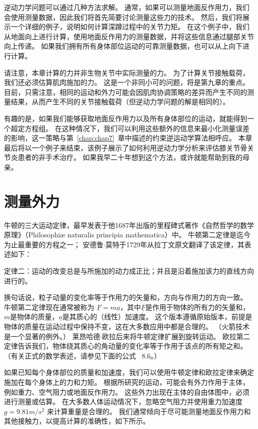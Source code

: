 逆动力学问题可以通过几种方法求解。
通常，如果可以测量地面反作用力，我们会使用测量数据，因此我们将首先简要讨论测量这些力的技术。
然后，我们将展示一个详细的例子，说明如何计算深蹲过程中的关节力矩。
在这个例子中，我们从地面向上进行计算，使用地面反作用力的测量数据，并将这些信息通过腿部关节向上传递。
如果我们拥有所有身体部位运动的可靠测量数据，也可以从上向下进行计算。


请注意，本章计算的力并非生物关节中实际测量的力。
为了计算关节接触载荷，我们还必须估算肌肉施加的力。
这是一个非同小可的问题，将是第九章的重点。
目前，只需注意，相同的运动和外力可能会因肌肉协调策略的差异而产生不同的测量结果，从而产生不同的关节接触载荷（但逆动力学问题的解是相同的）。


有趣的是，如果我们能够获取地面反作用力以及所有身体部位的运动，就能得到一个超定方程组。
在这种情况下，我们可以利用这些额外的信息来最小化测量误差的影响，这一策略与第~\ref{chap:chap7}~章中描述的约束逆运动学算法相呼应。
本章最后将以一个例子来结束，该例子展示了如何利用逆动力学分析来评估膝关节骨关节炎患者的非手术治疗。
如果我早二十年想到这个方法，或许就能帮助到我的母亲。



\section{测量外力}

牛顿的三大运动定律，最早发表于他1687年出版的里程碑式著作《自然哲学的数学原理》（Philosophiæ naturalis principia mathematica）中。
牛顿第二定律是迄今为止最重要的方程之一；
安德鲁$\cdot$莫特于1729年从拉丁文原文翻译了该定律，其表述如下：


定律二：运动的改变总是与所施加的动力成正比；并且是沿着施加该力的直线方向进行的。


换句话说，粒子动量的变化率等于作用力的矢量和，方向与作用力的方向一致。
牛顿第二定律现在通常被称为 $\underline{F} = m \underline{a}$，其中$\underline{F}$是作用于物体的所有力的矢量和，$m$是物体的质量，$\underline{a}$是其质心的（线性）加速度。
这个版本遵循原始版本，前提是物体的质量在运动过程中保持不变，这在大多数应用中都是合理的。
（火箭技术是一个显著的例外。）
莱昂哈德$\cdot$欧拉后来将牛顿定律扩展到旋转运动。
欧拉第二定律告诉我们，物体绕其质心的角动量的变化率等于作用于该点的所有矩之和。
（有关正式的数学表述，请参见下面的公式~ 8.6。）


如果已知每个身体部位的质量和加速度，我们可以使用牛顿定律和欧拉定律来确定施加在每个身体上的力和力矩。
根据所研究的运动，可能会有外力作用于主体，例如重力、空气阻力或地面反作用力。
这些外力出现在主体的自由体图中，必须进行测量或估算。
在大多数人体运动情况下，忽略空气阻力并使用重力加速度 $g = 9.81 m/s^2$ 来计算重量是合理的。
我们通常倾向于尽可能测量地面反作用力和其他接触力，以提高计算的准确性，如下所示。


